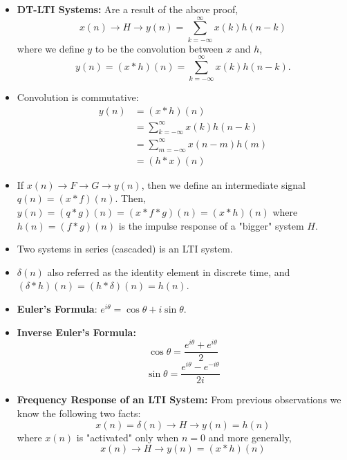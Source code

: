 \begin{itemize}
	\item \textbf{DT-LTI Systems:} Are a result of the above proof,
	      \[
		      x(n) \longrightarrow H \longrightarrow y(n) = \sum_{k=-\infty}^{\infty} x(k)h(n-k)
	      \]
	      where we define $y$ to be the convolution between $x$ and $h$,
	      \begin{equation}
		      y(n) = (x * h)(n) = \sum_{k=-\infty}^{\infty} x(k)h(n-k)
		      .\end{equation}
	\item Convolution is commutative:
	      \begin{align*}
		      y(n) & = (x * h)(n)                           \\
		           & = \sum_{k=-\infty}^{\infty} x(k)h(n-k) \\
		           & = \sum_{m=-\infty}^{\infty} x(n-m)h(m) \\
		           & = (h * x)(n)
	      \end{align*}
	\item If $x(n) \longrightarrow F \longrightarrow G \longrightarrow y(n)$,
	      then we define an intermediate signal $q(n) = (x * f)(n)$.
	      Then, $y(n) = (q * g)(n) = (x * f * g)(n) = (x * h)(n)$ where
	      $h(n) = (f * g)(n)$ is the impulse response of a "bigger" system
	      $H$.
	\item Two systems in series (cascaded) is an LTI system.
	\item $\delta(n)$ also referred as the identity element in discrete time,
	      and $(\delta * h)(n) = (h * \delta)(n) = h(n)$.
	\item \textbf{Euler's Formula}: $e^{i\theta} = \cos\theta + i\sin\theta$.
	\item \textbf{Inverse Euler's Formula:}
	      \begin{equation}
		      \cos\theta = \frac{e^{i\theta} + e^{i\theta}}{2}
	      \end{equation}
	      \begin{equation}
		      \sin\theta = \frac{e^{i\theta} - e^{-i\theta}}{2i}
	      \end{equation}
	\item \textbf{Frequency Response of an LTI System:} From previous observations
	      we know the following two facts:
	      \[
		      x(n) = \delta(n) \longrightarrow H \longrightarrow y(n) = h(n)
	      \]
	      where $x(n)$ is "activated" only when $n=0$ and more generally,
	      \[
		      x(n) \longrightarrow H \longrightarrow y(n) = (x * h)(n)
\]
\end{itemize}

